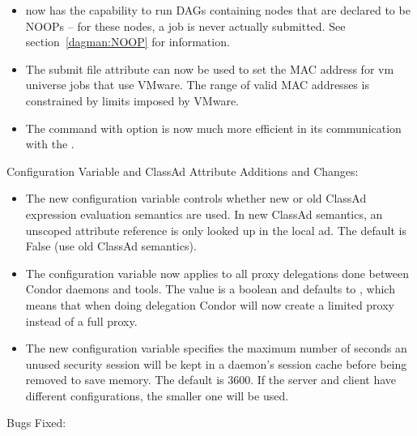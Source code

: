 \begin{itemize}
\item {} now has the capability to run DAGs containing nodes
that are declared to be NOOPs -- for these nodes, a job is never actually
submitted.  See section~\ref{dagman:NOOP} for information.

\item The submit file attribute  can now be used to set
the MAC address for vm universe jobs that use VMware. The range of valid
MAC addresses is constrained by limits imposed by VMware.

\item The  command with option 
is now much more efficient in its communication with the .

\end{itemize}

\noindent Configuration Variable and ClassAd Attribute Additions and Changes:

\begin{itemize}

\item The new configuration variable 
controls whether new or old ClassAd expression evaluation semantics are
used. In new ClassAd semantics, an unscoped attribute reference is only
looked up in the local ad. The default is False (use old ClassAd semantics).

\item The configuration variable
 now applies to all proxy
delegations done between Condor daemons and tools.
The value is a boolean and defaults to ,
which means that when doing delegation Condor will now create a limited proxy
instead of a full proxy.

\item The new configuration variable
   specifies the maximum
  number of seconds an unused security session will be kept in a daemon's
  session cache before being removed to save memory.  The default is 3600.
  If the server and client have different configurations, the smaller
  one will be used.

\end{itemize}

\noindent Bugs Fixed:


